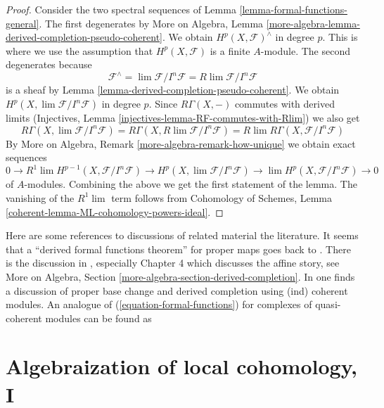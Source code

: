 \begin{proof}
Consider the two spectral sequences of
Lemma \ref{lemma-formal-functions-general}.
The first degenerates by More on Algebra, Lemma
\ref{more-algebra-lemma-derived-completion-pseudo-coherent}.
We obtain $H^p(X, \mathcal{F})^\wedge$ in degree $p$.
This is where we use the assumption that $H^p(X, \mathcal{F})$ is
a finite $A$-module. The second degenerates because
$$
\mathcal{F}^\wedge = \lim \mathcal{F}/I^n\mathcal{F} =
R\lim \mathcal{F}/I^n\mathcal{F}
$$
is a sheaf by Lemma \ref{lemma-derived-completion-pseudo-coherent}.
We obtain $H^p(X, \lim \mathcal{F}/I^n\mathcal{F})$ in degree $p$.
Since $R\Gamma(X, -)$ commutes with derived limits
(Injectives, Lemma \ref{injectives-lemma-RF-commutes-with-Rlim})
we also get
$$
R\Gamma(X, \lim \mathcal{F}/I^n\mathcal{F}) =
R\Gamma(X, R\lim \mathcal{F}/I^n\mathcal{F}) =
R\lim R\Gamma(X, \mathcal{F}/I^n\mathcal{F})
$$
By More on Algebra, Remark
\ref{more-algebra-remark-how-unique}
we obtain exact sequences
$$
0 \to
R^1\lim H^{p - 1}(X, \mathcal{F}/I^n\mathcal{F}) \to
H^p(X, \lim \mathcal{F}/I^n\mathcal{F}) \to
\lim H^p(X, \mathcal{F}/I^n\mathcal{F}) \to 0
$$
of $A$-modules. Combining the above we get the first statement of the lemma.
The vanishing of the $R^1\lim$ term follows from
Cohomology of Schemes, Lemma \ref{coherent-lemma-ML-cohomology-powers-ideal}.
\end{proof}

\begin{remark}
\label{remark-references}
Here are some references to discussions of related material the literature.
It seems that a ``derived formal functions theorem'' for proper maps
goes back to \cite[Theorem 6.3.1]{lurie-thesis}.
There is the discussion in \cite{dag12}, especially
Chapter 4 which discusses the affine story, see
More on Algebra, Section \ref{more-algebra-section-derived-completion}.
In \cite[Section 2.9]{G-R} one finds a discussion of proper base change and
derived completion using (ind) coherent modules.
An analogue of (\ref{equation-formal-functions})
for complexes of quasi-coherent modules can be found as
\cite[Theorem 6.5]{HL-P}
\end{remark}







\section{Algebraization of local cohomology, I}
\label{section-algebraization-sections-general}

